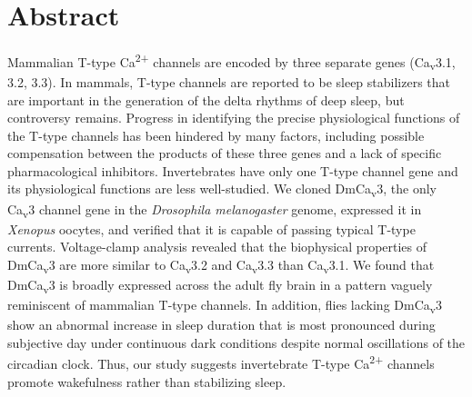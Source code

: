 \section*{Abstract}

Mammalian T-type Ca\textsuperscript{2+} channels are encoded by three separate genes (Ca\textsubscript{v}3.1, 3.2, 3.3).
In mammals, T-type channels are reported to be sleep stabilizers that are important in the generation of the delta rhythms of deep sleep, but controversy remains.
Progress in identifying the precise physiological functions of the T-type channels has been hindered by many factors, including possible compensation between the products of these three genes and a lack of specific pharmacological inhibitors.
Invertebrates have only one T-type channel gene and its physiological functions are less well-studied.
We cloned DmCa\textsubscript{v}3, the only Ca\textsubscript{v}3 channel gene in the \emph{Drosophila melanogaster} genome, expressed it in \emph{Xenopus} oocytes, and verified that it is capable of passing typical T-type currents.
Voltage-clamp analysis revealed that the biophysical properties of DmCa\textsubscript{v}3 are more similar to Ca\textsubscript{v}3.2 and Ca\textsubscript{v}3.3 than Ca\textsubscript{v}3.1.
We found that DmCa\textsubscript{v}3 is broadly expressed across the adult fly brain in a pattern vaguely reminiscent of mammalian T-type channels.
In addition, flies lacking DmCa\textsubscript{v}3 show an abnormal increase in sleep duration that is most pronounced during subjective day under continuous dark conditions despite normal oscillations of the circadian clock.
Thus, our study suggests invertebrate T-type Ca\textsuperscript{2+} channels promote wakefulness rather than stabilizing sleep.

  